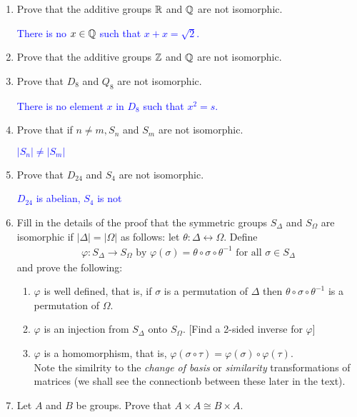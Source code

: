 \documentclass[10pt,a4paper]{report}
\newcommand{\BLUE}[1]{\textcolor{blue}{#1}}
\begin{document}
\begin{enumerate}
	\item Prove that the additive groups $\mathbb{R}$ and $\mathbb{Q}$ are not isomorphic.
	
	\BLUE{There is no $x \in \mathbb{Q}$ such that $x+x = \sqrt{2}$.
	}
	
	\item Prove that the additive groups $\mathbb{Z}$ and $\mathbb{Q}$ are not isomorphic.
	
	\item Prove that $D_8$ and $Q_8$ are not isomorphic.
	
	\BLUE{There is no element $x$ in $D_8$ such that $x^2=s$.
	}
	
	\item Prove that if $n \ne m, S_n$ and $S_m$ are not isomorphic.
	
	\BLUE{$|S_n| \ne |S_m|$}
	
	\item Prove that $D_{24}$ and $S_4$ are not isomorphic.
	
	\BLUE{$D_{24}$ is abelian, $S_4$ is not }
	
	\item Fill in the details of the proof that the symmetric groups $S_\Delta$ and $S_\Omega$ are isomorphic if $|\Delta|=|\Omega|$ as follows: let $\theta : \Delta \leftrightarrow \Omega$.  Define
	\begin{align*}
		\varphi : S_\Delta \to S_\Omega \text{ by } \varphi(\sigma)=\theta\circ\sigma\circ\theta^{-1} \text{ for all } \sigma \in S_\Delta
	\end{align*}and prove the following:
	\begin{enumerate}
		\item $\varphi$ is well defined, that is, if $\sigma$ is a permutation of $\Delta$ then $\theta\circ\sigma\circ\theta^{-1}$ is a permutation of $\Omega$.
		
		\item $\varphi$ is an injection from $S_\Delta$ onto $S_\Omega$. [Find a 2-sided inverse for $\varphi$]
		
		\item $\varphi$ is a homomorphism, that is, $\varphi(\sigma\circ\tau)=\varphi(\sigma)\circ\varphi(\tau)$.\\
		Note the similrity to the \textit{change of basis} or \textit{similarity} transformations of matrices (we shall see the connectionb between these later in the text).
	\end{enumerate}
	
	\item Let $A$ and $B$ be groups.  Prove that $A \times A \cong B \times A$.
	

\end{enumerate}
\end{document}
